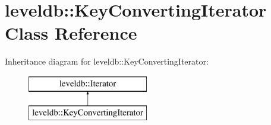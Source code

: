 \hypertarget{classleveldb_1_1_key_converting_iterator}{}\section{leveldb\+:\+:Key\+Converting\+Iterator Class Reference}
\label{classleveldb_1_1_key_converting_iterator}
Inheritance diagram for leveldb\+:\+:Key\+Converting\+Iterator\+:\begin{figure}[H]
\begin{center}
\leavevmode
\includegraphics[height=2.000000cm]{classleveldb_1_1_key_converting_iterator}
\end{center}
\end{figure}
